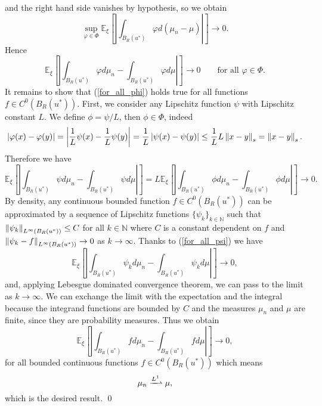 and the right hand side vanishes by hypothesis, so we obtain
\[ \sup_{\varphi \in \Phi} \mathbb{E}_{\xi} \left [ \left | \int_{B_R(u^*)} \varphi d(\mu_n - \mu) \right | \right ] \to 0. \]
Hence
\begin{equation}
\label{for_all_phi}
\mathbb{E}_{\xi} \left [ \left | \int_{B_R(u^*)} \varphi d \mu_n - \int_{B_R(u^*)} \varphi d \mu \right | \right ] \to 0 \qquad \text{for all } \varphi \in \Phi.
\end{equation}
It remains to show that (\ref{for_all_phi}) holds true for all functions $f \in C^0(B_R(u^*))$. First, we consider any Lipschitz function $\psi$ with Lipschitz constant $L$. We define $\phi = \psi/L$, then $\phi \in \Phi$, indeed
\begin{equation*}
\left\lvert\varphi(x) - \varphi(y)\right\rvert = \left | \frac{1}{L} \psi(x) - \frac{1}{L} \psi(y) \right | = \frac{1}{L} \left\lvert\psi(x) - \psi(y)\right\rvert \le \frac{1}{L} L \left\|x - y\right\|_s = \left\|x - y\right\|_s.
\end{equation*}
Therefore we have
\begin{equation}
\label{for_all_psi}
\mathbb{E}_{\xi} \left [ \left | \int_{B_R(u^*)} \psi d \mu_n - \int_{B_R(u^*)} \psi d \mu \right | \right ] = L \mathbb{E}_{\xi} \left [ \left | \int_{B_R(u^*)} \phi d \mu_n - \int_{B_R(u^*)} \phi d \mu \right | \right ] \to 0.
\end{equation}
By density, any continuous bounded function $f \in C^0(B_R(u^*))$ can be approximated by a sequence of Lipschitz functions $\{ \psi_k \}_{k \in \mathbb{N}}$ such that $\left\|\psi_k\right\|_{L^{\infty}(B_R(u^*))} \le C$ for all $k \in \mathbb{N}$ where $C$ is a constant dependent on $f$ and $\left\|\psi_k - f\right\|_{L^{\infty}(B_R(u^*))} \to 0$ as $k \to \infty$. Thanks to (\ref{for_all_psi}) we have
\[ \mathbb{E}_{\xi} \left [ \left | \int_{B_R(u^*)} \psi_k d \mu_n - \int_{B_R(u^*)} \psi_k d \mu \right | \right ] \to 0, \]
and, applying Lebesgue dominated convergence theorem, we can pass to the limit as $k \to \infty$. We can exchange the limit with the expectation and the integral because the integrand functions are bounded by $C$ and the measures $\mu_n$ and $\mu$ are finite, since they are probability measures. Thus we obtain
\[ \mathbb{E}_{\xi} \left [ \left | \int_{B_R(u^*)} f d \mu_n - \int_{B_R(u^*)} f d \mu \right | \right ] \to 0, \]
for all bounded continuous functions $f \in C^0(B_R(u^*))$ which means
\[ \mu_n \xrightharpoonup{L^1} \mu, \]
which is the desired result.
\qed